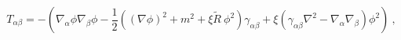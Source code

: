 \begin{equation}\label{2.1}
T_{\alpha\beta}=-\left(\nabla_\alpha\phi\nabla_\beta\phi-
\frac 12 ((\nabla \phi)^2+m^2+\xi
\tilde{R}~\phi^2)\gamma_{\alpha\beta}+\xi (\gamma_{\alpha\beta}
\nabla^2-\nabla_\alpha\nabla_\beta )\phi^2\right)~,
\end{equation}

